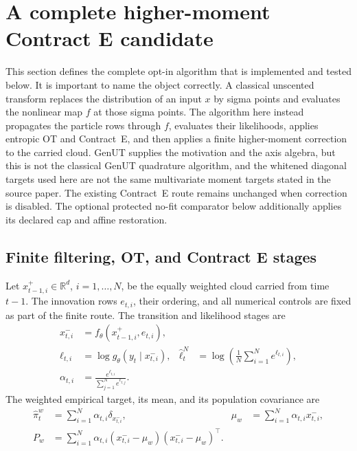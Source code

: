\FloatBarrier

\section{A complete higher-moment Contract E candidate}
\label{sec:bf-eot-higher-moment-contract-e}

This section defines the complete opt-in algorithm that is implemented and
tested below.  It is important to name the object correctly.  A classical
unscented transform replaces the distribution of an input \(x\) by sigma
points and evaluates the nonlinear map \(f\) at those sigma points.  The
algorithm here instead propagates the particle rows through \(f\), evaluates
their likelihoods, applies entropic OT and Contract~E, and then applies a
finite higher-moment correction to the carried cloud.  GenUT supplies the motivation and the axis algebra, but this is not the
classical GenUT quadrature algorithm, and the whitened diagonal targets used
here are not the same multivariate moment targets stated in the source paper.  The existing Contract~E route remains
unchanged when correction is disabled.  The optional protected no-fit
comparator below additionally applies its declared cap and affine restoration.

\subsection{Finite filtering, OT, and Contract E stages}

Let \(x_{t-1,i}^{+}\in\mathbb R^d\), \(i=1,\ldots,N\), be the equally
weighted cloud carried from time \(t-1\).  The innovation rows \(e_{t,i}\),
their ordering, and all numerical controls are fixed as part of the finite
route.  The transition and likelihood stages are
\begin{align}
 x_{t,i}^{-}&=f_\theta(x_{t-1,i}^{+},e_{t,i}),
 \label{eq:bf-eot-hm-transition}\\
 \ell_{t,i}&=\log g_\theta(y_t\mid x_{t,i}^{-}),
 &\widehat\ell_t^N&=\log\!\left(\frac1N\sum_{i=1}^N
 e^{\ell_{t,i}}\right),
 \label{eq:bf-eot-hm-likelihood}\\
 \alpha_{t,i}&=
 \frac{e^{\ell_{t,i}}}{\sum_{j=1}^N e^{\ell_{t,j}}}.
 \label{eq:bf-eot-hm-weights}
\end{align}
The weighted empirical target, its mean, and its population covariance are
\begin{align}
 \widehat\pi_t^w&=\sum_{i=1}^N\alpha_{t,i}\delta_{x_{t,i}^{-}},
 &\mu_w&=\sum_{i=1}^N\alpha_{t,i}x_{t,i}^{-},\\
 P_w&=\sum_{i=1}^N\alpha_{t,i}
 (x_{t,i}^{-}-\mu_w)(x_{t,i}^{-}-\mu_w)^\top.
 \label{eq:bf-eot-hm-weighted-moments}
\end{align}

